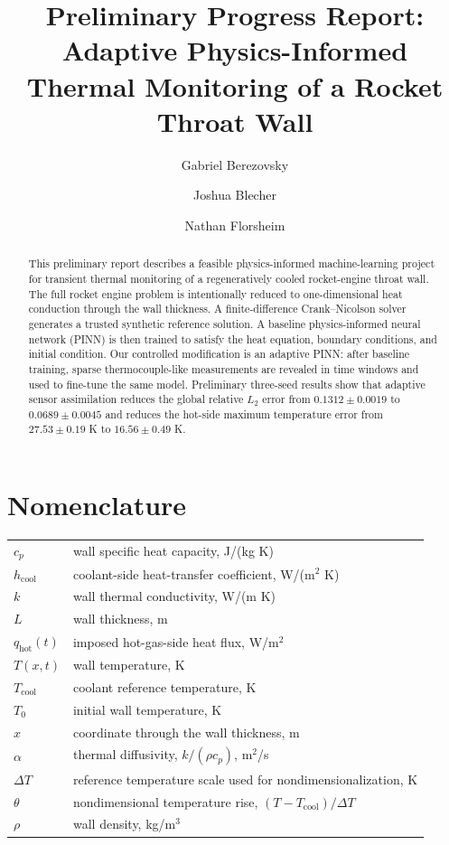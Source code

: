 \documentclass[journal]{new-aiaa}
\title{Preliminary Progress Report: Adaptive Physics-Informed Thermal Monitoring of a Rocket Throat Wall}
\author{Gabriel Berezovsky}
\affil{gabrielb@campus.technion.ac.il, 941220121}
\author{Joshua Blecher}
\affil{bjoshua@campus.technion.ac.il, 941220097}
\author{Nathan Florsheim}
\affil{nathanf@campus.technion.ac.il, 800001653}
\begin{document}
\maketitle

\begin{abstract}
This preliminary report describes a feasible physics-informed machine-learning project for transient thermal monitoring of a regeneratively cooled rocket-engine throat wall. The full rocket engine problem is intentionally reduced to one-dimensional heat conduction through the wall thickness. A finite-difference Crank--Nicolson solver generates a trusted synthetic reference solution. A baseline physics-informed neural network (PINN) is then trained to satisfy the heat equation, boundary conditions, and initial condition. Our controlled modification is an adaptive PINN: after baseline training, sparse thermocouple-like measurements are revealed in time windows and used to fine-tune the same model. Preliminary three-seed results show that adaptive sensor assimilation reduces the global relative $L_2$ error from $0.1312 \pm 0.0019$ to $0.0689 \pm 0.0045$ and reduces the hot-side maximum temperature error from $27.53 \pm 0.19$ K to $16.56 \pm 0.49$ K.
\end{abstract}

\section*{Nomenclature}
{\renewcommand\arraystretch{1.0}
\noindent\begin{longtable*}{@{}l @{\quad=\quad} l@{}}
$c_p$ & wall specific heat capacity, J/(kg K)\\
$h_{\mathrm{cool}}$ & coolant-side heat-transfer coefficient, W/(m$^2$ K)\\
$k$ & wall thermal conductivity, W/(m K)\\
$L$ & wall thickness, m\\
$q_{\mathrm{hot}}(t)$ & imposed hot-gas-side heat flux, W/m$^2$\\
$T(x,t)$ & wall temperature, K\\
$T_{\mathrm{cool}}$ & coolant reference temperature, K\\
$T_0$ & initial wall temperature, K\\
$x$ & coordinate through the wall thickness, m\\
$\alpha$ & thermal diffusivity, $k/(\rho c_p)$, m$^2$/s\\
$\Delta T$ & reference temperature scale used for nondimensionalization, K\\
$\theta$ & nondimensional temperature rise, $(T-T_{\mathrm{cool}})/\Delta T$\\
$\rho$ & wall density, kg/m$^3$\\
\end{longtable*}}
\addtocounter{table}{-1}
\end{document}
